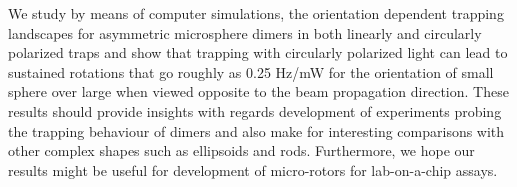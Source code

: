 \documentclass[preprint,  3p]{elsarticle}
\begin{document}
We study by means of computer simulations, the orientation dependent trapping landscapes for asymmetric microsphere dimers in both linearly and circularly polarized traps and show that trapping with circularly polarized light can lead to sustained rotations that go roughly as 0.25 Hz/mW for the orientation of small sphere over large when viewed opposite to the beam propagation direction. These results should provide insights with regards development of experiments probing the trapping behaviour of dimers and also make for interesting comparisons with other complex shapes such as ellipsoids and rods. Furthermore, we hope our results might be useful for development of micro-rotors for lab-on-a-chip assays. 


\newpage
 



\end{document}
